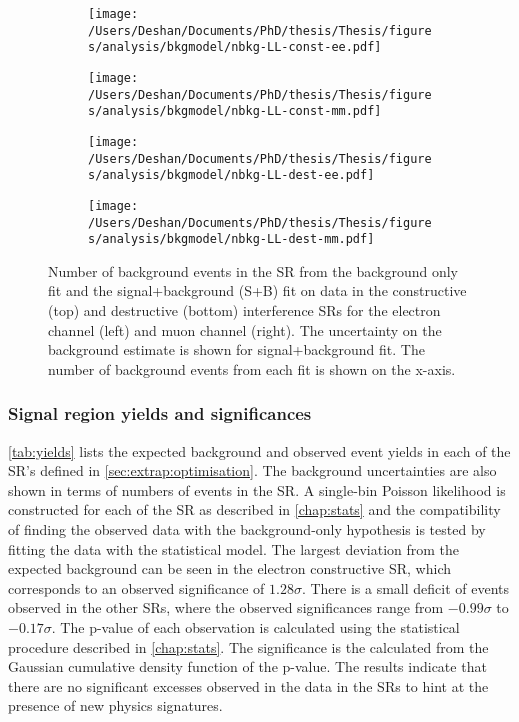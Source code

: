 \begin{figure}[h!]
    \centering
    \begin{subfigure}[b]{0.49\textwidth}
        \centering
        \texttt{[image: /Users/Deshan/Documents/PhD/thesis/Thesis/figures/analysis/bkgmodel/nbkg-LL-const-ee.pdf]}
        \label{fig:results:fitsbplusb1}
    \end{subfigure}
    \begin{subfigure}[b]{0.49\textwidth}
        \centering
        \texttt{[image: /Users/Deshan/Documents/PhD/thesis/Thesis/figures/analysis/bkgmodel/nbkg-LL-const-mm.pdf]}
        \label{fig:results:fitsbplusb2}
    \end{subfigure}
    \begin{subfigure}[b]{0.49\textwidth}
        \centering
        \texttt{[image: /Users/Deshan/Documents/PhD/thesis/Thesis/figures/analysis/bkgmodel/nbkg-LL-dest-ee.pdf]}
        \label{fig:results:fitsbplusb3}
    \end{subfigure}
    \begin{subfigure}[b]{0.49\textwidth}
        \centering
        \texttt{[image: /Users/Deshan/Documents/PhD/thesis/Thesis/figures/analysis/bkgmodel/nbkg-LL-dest-mm.pdf]}
        \label{fig:results:fitsbplusb4}
    \end{subfigure}
    \caption[Background estimation comparisons of the signal+background fit and background only fit in data]{Number of background events in the SR from the background only fit and the signal+background (S+B) fit on data in the constructive (top) and destructive (bottom) interference SRs for the electron channel (left) and muon channel (right). The uncertainty on the background estimate is shown for signal+background fit. The number of background events from each fit is shown on the x-axis.}
    \label{fig:results:fitsbplusb}
\end{figure}

\subsubsection{Signal region yields and significances}
\cref{tab:yields} lists the expected background and observed event yields in each of the SR's defined in \cref{sec:extrap:optimisation}. The background uncertainties are also shown in terms of numbers of events in the SR. A single-bin Poisson likelihood is constructed for each of the SR as described in \cref{chap:stats} and the compatibility of finding the observed data with the background-only hypothesis is tested by fitting the data with the statistical model. The largest deviation from the expected background can be seen in the electron constructive SR, which corresponds to an observed significance of $1.28\sigma$. There is a small deficit of events observed in the other SRs, where the observed significances range from $-0.99\sigma$ to $-0.17\sigma$. The p-value of each observation is calculated using the statistical procedure described in \cref{chap:stats}. The significance is the calculated from the Gaussian cumulative density function of the p-value. The results indicate that there are no significant excesses observed in the data in the SRs to hint at the presence of new physics signatures. 

